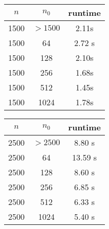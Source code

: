 \documentclass{article}
\begin{document}
\begin{center}
\begin{tabular} { |c|c|c| }
\hline
$n$ & $n_0$ & runtime \\
\hline\hline
1500 & $>1500$ & 2.11s \\
\hline\hline
1500 & 64 & 2.72 s \\
\hline
1500 & 128 & 2.10s \\
\hline
1500 & 256 & 1.68s\\
\hline
1500 & 512 & 1.45s \\ 
\hline
1500 & 1024 & 1.78s\\
\hline
\end{tabular}
\end{center}

\begin{center}
\begin{tabular} { |c|c|c| }
\hline
$n$ & $n_0$ & runtime \\
\hline\hline
2500 & $>2500$ & 8.80 s \\
\hline\hline
2500 & 64 &  13.59 s \\
\hline
2500 & 128 & 8.60 s \\
\hline
2500 & 256 &  6.85 s\\
\hline
2500 & 512 & 6.33 s \\ 
\hline
2500 & 1024 & 5.40 s\\
\hline
\end{tabular}
\end{center}
\end{document}
